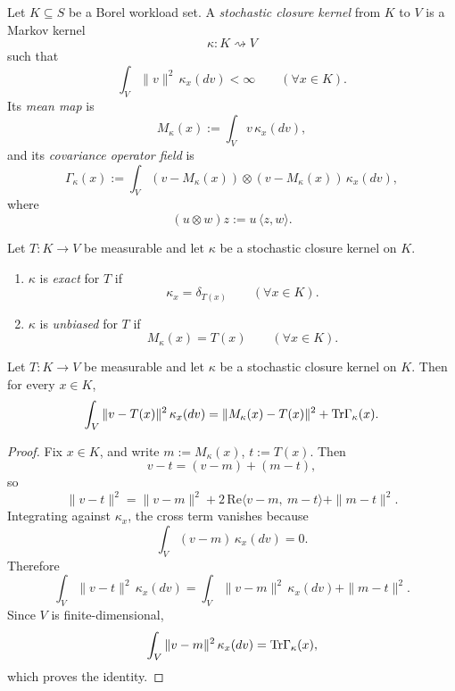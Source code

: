 \begin{definition}
\label{def:stochastic-closure-kernel}
Let \(K\subseteq S\) be a Borel workload set. A \emph{stochastic closure
kernel} from \(K\) to \(V\) is a Markov kernel
\[
\kappa:K\rightsquigarrow V
\]
such that
\[
\int_V \|v\|^2\,\kappa_x(dv)<\infty
\qquad (\forall x\in K).
\]
Its \emph{mean map} is
\[
M_{\kappa}(x):=\int_V v\,\kappa_x(dv),
\]
and its \emph{covariance operator field} is
\[
\Gamma_{\kappa}(x)
:=
\int_V (v-M_{\kappa}(x))\otimes(v-M_{\kappa}(x))\,\kappa_x(dv),
\]
where
\[
(u\otimes w)z:=u\,\langle z,w\rangle.
\]
\end{definition}

\begin{definition}
\label{def:stochastic-exactness-unbiasedness}
Let \(T:K\to V\) be measurable and let \(\kappa\) be a stochastic closure
kernel on \(K\).
\begin{enumerate}[label=(\roman*), leftmargin=2em, itemsep=0.2em]
\item \(\kappa\) is \emph{exact} for \(T\) if
      \[
      \kappa_x=\delta_{T(x)}
      \qquad (\forall x\in K).
      \]
\item \(\kappa\) is \emph{unbiased} for \(T\) if
      \[
      M_{\kappa}(x)=T(x)
      \qquad (\forall x\in K).
      \]
\end{enumerate}
\end{definition}

\begin{theorem}
\label{thm:pointwise-bias-variance}
Let \(T:K\to V\) be measurable and let \(\kappa\) be a stochastic closure
kernel on \(K\). Then for every \(x\in K\),
\[
\int_V \|v-T(x)\|^2\,\kappa_x(dv)
=
\|M_{\kappa}(x)-T(x)\|^2
+
\mathrm{Tr}\Gamma_{\kappa}(x).
\]
\end{theorem}

\begin{proof}
Fix \(x\in K\), and write \(m:=M_{\kappa}(x)\), \(t:=T(x)\). Then
\[
v-t=(v-m)+(m-t),
\]
so
\[
\|v-t\|^2
=
\|v-m\|^2
+
2\,\mathrm{Re}\langle v-m,\ m-t\rangle
+
\|m-t\|^2.
\]
Integrating against \(\kappa_x\), the cross term vanishes because
\[
\int_V (v-m)\,\kappa_x(dv)=0.
\]
Therefore
\[
\int_V \|v-t\|^2\,\kappa_x(dv)
=
\int_V \|v-m\|^2\,\kappa_x(dv)
+
\|m-t\|^2.
\]
Since \(V\) is finite-dimensional,
\[
\int_V \|v-m\|^2\,\kappa_x(dv)=\mathrm{Tr}\Gamma_{\kappa}(x),
\]
which proves the identity.
\end{proof}

